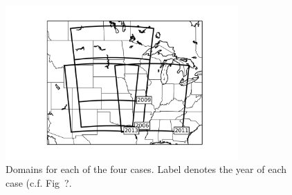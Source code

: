 \documentclass{ametsoc}
\begin{document}
\begin{figure}[tbph]
\centering
\includegraphics[width=21pc]{images/domains}
\caption{Domains for each of the four cases. Label denotes the year of each case (c.f. Fig~?.}
\label{fig:domains}
\end{figure}
\end{document}
